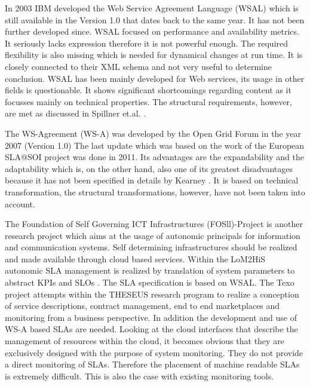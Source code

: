 In 2003 IBM developed the Web Service Agreement Language (WSAL) \cite{Ludwig03WSLA} which is still available in the Version 1.0 that dates back to the same year. It has not been further developed since. WSAL focused on performance and availability metrics. It seriously lacks expression therefore it is not powerful enough. The required flexibility is also missing which is needed for dynamical changes at run time. It is closely connected to their XML schema and not very useful to determine conclusion.
WSAL has been mainly developed for Web services, its usage in other fields is questionable. It shows significant shortcomings regarding content as it focusses mainly on technical properties. The structural requirements, however, are met as discussed in Spillner et.al. \cite{Spillner2009}.

The WS-Agreement (WS-A) was developed by the Open Grid Forum in the year 2007 (Version 1.0) The last update which was based on the work of the European SLA@SOI project was done in 2011. Its advantages are the expandability and the adaptability which is, on the other hand, also one of its greatest disadvantages because it has not been specified in details by Kearney \cite{Kearney2011b}. It is based on technical transformation, the structural transformations, however, have not been taken into account.

The Foundation of Self Governing ICT Infrastructures (FOSll)-Project \cite{fosii} is another research project which aims at the usage of autonomic principals for information and communication systems. Self determining infrastructures should be realized and made available through cloud based services. Within the LoM2HiS autonomic SLA management is realized by translation of system parameters to abstract KPIs and SLOs  \cite{Brandic:2009:VFE:1616056.1616063}. The SLA specification is based on WSAL. The Texo project \cite{texo2011} attempts within the THESEUS research program to realize a conception of service descriptions, contract management, end to end marketplaces and monitoring from a business perspective. In addition the development and use of WS-A based SLAs are needed. Looking at the cloud interfaces that describe the management of resources within the cloud, it becomes obvious that they are exclusively designed with the purpose of system monitoring. They do not provide a direct monitoring of SLAs. Therefore the placement of machine readable SLAs is extremely difficult. This is also the case with existing monitoring tools.

